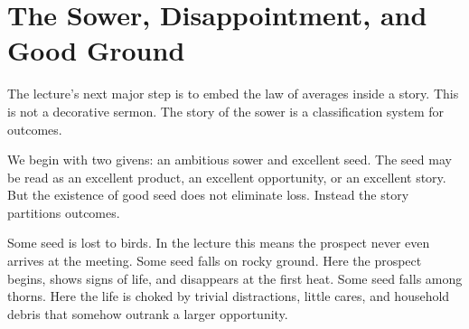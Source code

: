 \section{The Sower, Disappointment, and Good Ground}

The lecture's next major step is to embed the law of averages inside a story. This is not a decorative sermon. The story of the sower is a classification system for outcomes.

We begin with two givens: an ambitious sower and excellent seed. The seed may be read as an excellent product, an excellent opportunity, or an excellent story. But the existence of good seed does not eliminate loss. Instead the story partitions outcomes.

\begin{figure}[h]
\centering
{}
\end{figure}

Some seed is lost to birds. In the lecture this means the prospect never even arrives at the meeting. Some seed falls on rocky ground. Here the prospect begins, shows signs of life, and disappears at the first heat. Some seed falls among thorns. Here the life is choked by trivial distractions, little cares, and household debris that somehow outrank a larger opportunity.

